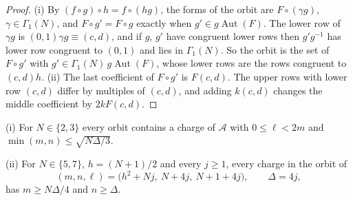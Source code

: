 \begin{proof}
(i) By $(f\circ g)\circ h=f\circ(hg)$, the forms of the orbit are $F\circ(\gamma g)$, $\gamma\in\Gamma_1(N)$, and $F\circ g'=F\circ g$ exactly when $g'\in g\operatorname{Aut}(F)$. The lower row of $\gamma g$ is $(0,1)\gamma g\equiv(c,d)$, and if $g$, $g'$ have congruent lower rows then $g'g^{-1}$ has lower row congruent to $(0,1)$ and lies in $\Gamma_1(N)$. So the orbit is the set of $F\circ g'$ with $g'\in\Gamma_1(N)\,g\operatorname{Aut}(F)$, whose lower rows are the rows congruent to $(c,d)h$.
(ii) The last coefficient of $F\circ g'$ is $F(c,d)$. The upper rows with lower row $(c,d)$ differ by multiples of $(c,d)$, and adding $k(c,d)$ changes the middle coefficient by $2kF(c,d)$.
\end{proof}

\begin{proposition}\label{prop:chlsize}
\textup{(i)} For $N\in\{2,3\}$ every orbit contains a charge of $\mathcal A$ with $0\le\ell<2m$ and $\min(m,n)\le\sqrt{N\Delta/3}$.

\textup{(ii)} For $N\in\{5,7\}$, $h=(N+1)/2$ and every $j\ge1$, every charge in the orbit of
\[
(m,n,\ell)=\big(h^2+Nj,\ N+4j,\ N+1+4j\big),\qquad \Delta=4j,
\]
has $m\ge N\Delta/4$ and $n\ge\Delta$.
\end{proposition}

